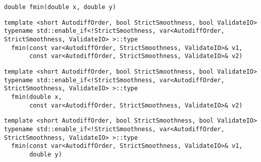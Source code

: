 \begin{tcolorbox}[colback=white,colframe=gray90, coltitle=black,boxrule=3pt,
fonttitle=\bfseries,title= Fmin]

\begin{verbatim}
double fmin(double x, double y)

\end{verbatim}

\begin{verbatim}
template <short AutodiffOrder, bool StrictSmoothness, bool ValidateIO>
typename std::enable_if<!StrictSmoothness, var<AutodiffOrder, StrictSmoothness, ValidateIO> >::type
  fmin(const var<AutodiffOrder, StrictSmoothness, ValidateIO>& v1,
       const var<AutodiffOrder, StrictSmoothness, ValidateIO>& v2)

\end{verbatim}

\begin{verbatim}
template <short AutodiffOrder, bool StrictSmoothness, bool ValidateIO>
typename std::enable_if<!StrictSmoothness, var<AutodiffOrder, StrictSmoothness, ValidateIO> >::type
  fmin(double x,
       const var<AutodiffOrder, StrictSmoothness, ValidateIO>& v2)

\end{verbatim}

\begin{verbatim}
template <short AutodiffOrder, bool StrictSmoothness, bool ValidateIO>
typename std::enable_if<!StrictSmoothness, var<AutodiffOrder, StrictSmoothness, ValidateIO> >::type
  fmin(const var<AutodiffOrder, StrictSmoothness, ValidateIO>& v1,
       double y)

\end{verbatim}

\end{tcolorbox}

